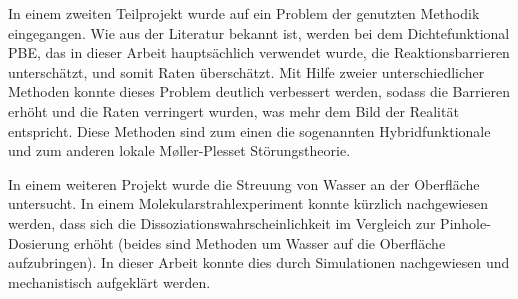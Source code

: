 \documentclass[11pt,DIV=13,a4paper,headinclude,german]{scrartcl}
\begin{document}
In einem zweiten Teilprojekt wurde auf ein Problem der genutzten Methodik eingegangen.
Wie aus der Literatur bekannt ist, werden bei dem Dichtefunktional PBE, das in dieser Arbeit hauptsächlich verwendet wurde, die Reaktionsbarrieren unterschätzt, und somit Raten überschätzt.
Mit Hilfe zweier unterschiedlicher Methoden konnte dieses Problem deutlich verbessert werden, sodass die Barrieren erhöht und die Raten verringert wurden, was mehr dem Bild der Realität entspricht.
Diese Methoden sind zum einen die sogenannten Hybridfunktionale und zum anderen lokale M\o{}ller-Plesset Störungstheorie.

In einem weiteren Projekt wurde die Streuung von Wasser an der Oberfläche untersucht.
In einem Molekularstrahlexperiment konnte kürzlich nachgewiesen werden, dass sich die Dissoziationswahrscheinlichkeit im Vergleich zur Pinhole-Dosierung erhöht (beides sind Methoden um Wasser auf die Oberfläche aufzubringen).
In dieser Arbeit konnte dies durch Simulationen nachgewiesen und mechanistisch aufgeklärt werden.
\end{document}
